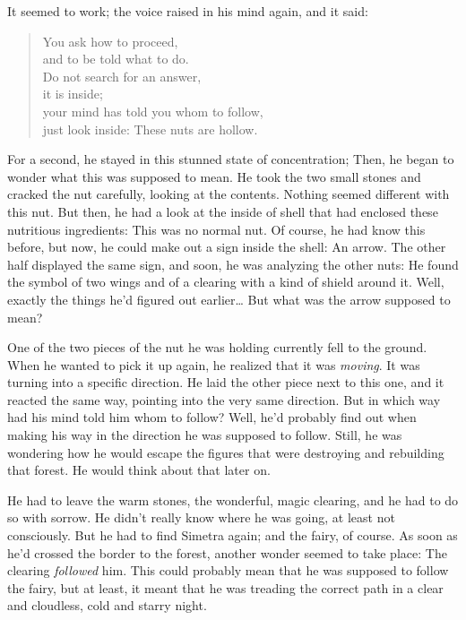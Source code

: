 It seemed to work; the voice raised in his mind again, and it said: 
\begin{quote}
You ask how to proceed,\\
and to be told what to do.\\
Do not search for an answer,\\
it is inside;\\
your mind has told you whom to follow,\\
just look inside: These nuts are hollow.
\end{quote}
For a second, he stayed in this stunned state of concentration; Then, he began to wonder what this was supposed to mean. He took the two small stones and cracked the nut carefully, looking at the contents. Nothing seemed different with this nut. But then, he had a look at the inside of shell that had enclosed these nutritious ingredients: This was no normal nut.
Of course, he had know this before, but now, he could make out a sign inside the shell: An arrow. The other half displayed the same sign, and soon, he was analyzing the other nuts: He found the symbol of two wings and of a clearing with a kind of shield around it. Well, exactly the things he'd figured out earlier\dots
But what was the arrow supposed to mean? 

One of the two pieces of the nut he was holding currently fell to the ground. When he wanted to pick it up again, he realized that it was \emph{moving}. It was turning into a specific direction. He laid the other piece next to this one, and it reacted the same way, pointing into the very same direction. But in which way had his mind told him whom to follow? 
Well, he'd probably find out when making his way in the direction he was supposed to follow. Still, he was wondering how he would escape the figures that were destroying and rebuilding that forest. He would think about that later on.

He had to leave the warm stones, the wonderful, magic clearing, and he had to do so with sorrow. He didn't really know where he was going, at least not consciously. But he had to find Simetra again; and the fairy, of course. 
As soon as he'd crossed the border to the forest, another wonder seemed to take place: The clearing \emph{followed} him. This could probably mean that he was supposed to follow the fairy, but at least, it meant that he was treading the correct path in a clear and cloudless, cold and starry night. 

